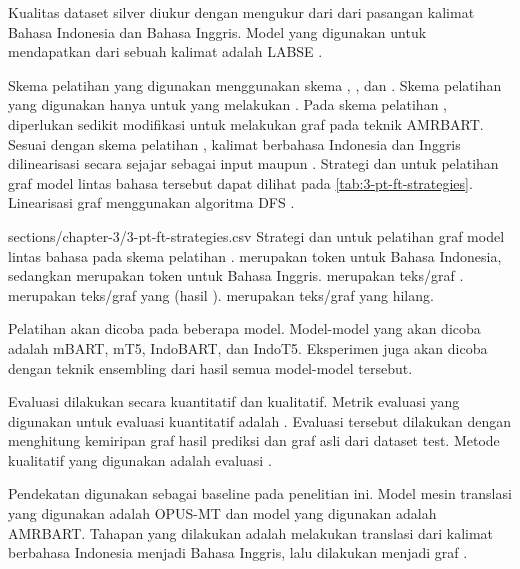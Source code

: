 Kualitas dataset silver diukur dengan mengukur \cossim{} dari \multil{}  dari pasangan kalimat Bahasa Indonesia dan Bahasa Inggris.
Model \mwordem{} yang digunakan untuk mendapatkan \multil{}  dari sebuah kalimat adalah \gls{LABSE} .

Skema pelatihan yang digunakan menggunakan skema , , dan .
Skema pelatihan yang digunakan hanya untuk yang melakukan \amrparsing{}.
Pada skema pelatihan , diperlukan sedikit modifikasi untuk melakukan \pretraining{} graf pada teknik \gls{AMRBART}.
Sesuai dengan skema pelatihan , kalimat berbahasa Indonesia dan Inggris dilinearisasi secara sejajar sebagai input \pretraining{} maupun \finetuning{}.
Strategi \pretraining{} dan \finetuning{} untuk pelatihan graf model \amrparsing{} lintas bahasa tersebut dapat dilihat pada \cref{tab:3-pt-ft-strategies}.
Linearisasi graf menggunakan algoritma \gls{DFS} .

  {sections/chapter-3/3-pt-ft-strategies.csv}
  {
    Strategi \pretraining{} dan \finetuning{} untuk pelatihan graf model \amrparsing{} lintas bahasa pada skema pelatihan .
     merupakan token untuk Bahasa Indonesia, sedangkan  merupakan token untuk Bahasa Inggris.
     merupakan teks/graf .
     merupakan teks/graf yang  (hasil \denoising{}).
     merupakan teks/graf yang hilang.
  }

Pelatihan \amrparsing{} akan dicoba pada beberapa \multil{} model.
Model-model yang akan dicoba adalah mBART, mT5, IndoBART, dan IndoT5.
Eksperimen \amrparsing{} juga akan dicoba dengan teknik \AMR{} ensembling  dari hasil semua model-model tersebut.

Evaluasi dilakukan secara kuantitatif dan kualitatif.
Metrik evaluasi yang digunakan untuk evaluasi kuantitatif adalah \SMATCH{}.
Evaluasi tersebut dilakukan dengan menghitung kemiripan graf \AMR{} hasil prediksi dan graf \AMR{} asli dari dataset test.
Metode kualitatif yang digunakan adalah evaluasi \transdiver{}.

Pendekatan   digunakan sebagai baseline pada penelitian ini.
Model mesin translasi yang digunakan adalah {OPUS-MT} dan model \amrparsing{} yang digunakan adalah \gls{AMRBART}.
Tahapan yang dilakukan adalah melakukan translasi dari kalimat berbahasa Indonesia menjadi Bahasa Inggris, lalu dilakukan \amrparsing{} menjadi graf \AMR{}.
